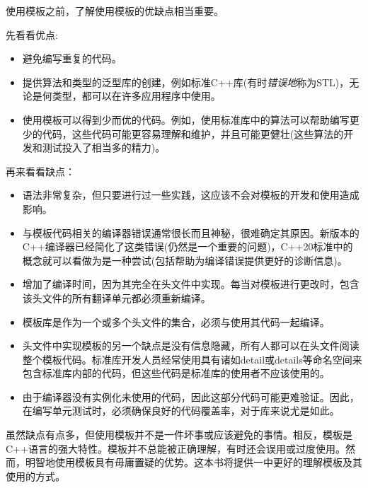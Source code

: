 
使用模板之前，了解使用模板的优缺点相当重要。

先看看优点:

\begin{itemize}
\item
避免编写重复的代码。

\item
提供算法和类型的泛型库的创建，例如标准C++库(有时\textit{错误地}称为STL)，无论是何类型，都可以在许多应用程序中使用。

\item
使用模板可以得到少而优的代码。例如，使用标准库中的算法可以帮助编写更少的代码，这些代码可能更容易理解和维护，并且可能更健壮(这些算法的开发和测试投入了相当多的精力)。
\end{itemize}

再来看看缺点：

\begin{itemize}
\item
语法非常复杂，但只要进行过一些实践，这应该不会对模板的开发和使用造成影响。

\item
与模板代码相关的编译器错误通常很长而且神秘，很难确定其原因。新版本的C++编译器已经简化了这类错误(仍然是一个重要的问题)，C++20标准中的概念就可以看做为是一种尝试(包括帮助为编译错误提供更好的诊断信息)。

\item
增加了编译时间，因为其完全在头文件中实现。每当对模板进行更改时，包含该头文件的所有翻译单元都必须重新编译。

\item
模板库是作为一个或多个头文件的集合，必须与使用其代码一起编译。

\item
头文件中实现模板的另一个缺点是没有信息隐藏，所有人都可以在头文件阅读整个模板代码。标准库开发人员经常使用具有诸如detail或details等命名空间来包含标准库内部的代码，但这些代码是标准库的使用者不应该使用的。

\item
由于编译器没有实例化未使用的代码，因此这部分代码可能更难验证。因此，在编写单元测试时，必须确保良好的代码覆盖率，对于库来说尤是如此。
\end{itemize}

虽然缺点有点多，但使用模板并不是一件坏事或应该避免的事情。相反，模板是C++语言的强大特性。模板并不总能被正确理解，有时还会误用或过度使用。然而，明智地使用模板具有毋庸置疑的优势。这本书将提供一中更好的理解模板及其使用的方式。







